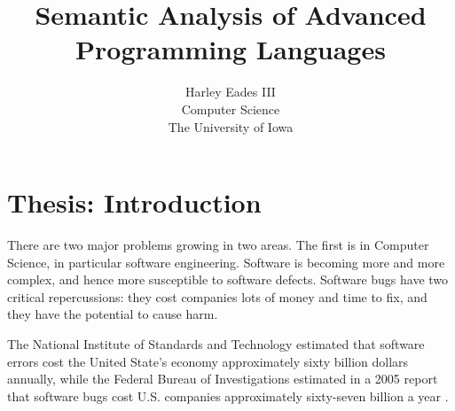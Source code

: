 \usepackage{amsmath,amssymb,amsthm,amstext}
\usepackage{mathpartir}
\usepackage{vmargin}
\usepackage{enumitem}
\usepackage{url}
\usepackage{todonotes}
\usepackage{listings}
\usepackage{stmaryrd} 
\usepackage{graphicx}
\usepackage{tikz}
\usepackage{hyperref}
\usetikzlibrary{arrows}
\usetikzlibrary{shapes}

\newtheorem{theorem}{Theorem}
\newtheorem{lemma}[theorem]{Lemma}
\newtheorem{corollary}[theorem]{Corollary}
\newtheorem{definition}[theorem]{Definition}
\newtheorem{proposition}[theorem]{Proposition}
\newtheorem{example}[theorem]{Example}

\newcommand{\redto}[0]{\rightsquigarrow}
\newcommand{\interp}[1]{\llbracket #1 \rrbracket}
\newcommand{\ifrName}[1]{#1}
\newcommand{\Sep}[0]{\text{SepPP}}

\newcommand{\chcalc}[0]{\bar{\lambda}\mu\tilde{\mu}}

\newcommand{\cse}[0]{\noindent\underline{\textbf{Case:}}\ }


\newcommand{\ndto}[1]{\to_{#1}}
\newcommand{\ndwedge}[1]{\wedge_{#1}}

\newcommand{\To}[0]{\Rightarrow}



\title{Semantic Analysis of Advanced Programming Languages}

\author{Harley Eades III\\ Computer Science\\ The University of Iowa}

\date{}

\maketitle

\section{Thesis: Introduction}
\label{sec:introduction}
There are two major problems growing in two areas.  The first is in
Computer Science, in particular software engineering. Software is
becoming more and more complex, and hence more susceptible to software
defects.  Software bugs have two critical repercussions: they cost
companies lots of money and time to fix, and they have the potential
to cause harm. 

The National Institute of Standards and Technology estimated that
software errors cost the United State's economy approximately sixty
billion dollars annually, while the Federal Bureau of Investigations
estimated in a 2005 report that software bugs cost U.S. companies
approximately sixty-seven billion a year \cite{nist02,fbi05}.


